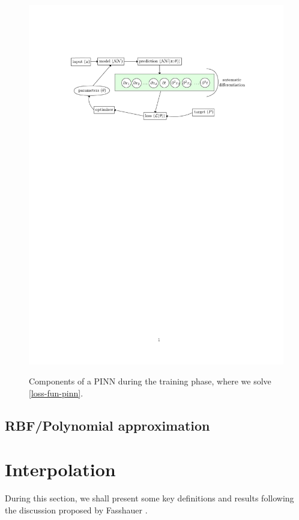 \documentclass[12pt]{report} %
\begin{document}
\begin{figure}[ht]
  \centering
  {\includegraphics[width=\textwidth, clip=true, trim={3cm 20cm 3cm 4cm}]{imagenes/autodiffgraph.pdf}}
  \caption{Components of a PINN during the training phase, where we solve \eqref{loss-fun-pinn}.
  }\label{fig:autodiffgraph}
\end{figure}

\section{RBF/Polynomial approximation}

\chapter{Interpolation}

During this section, we shall present some key definitions and results
following the discussion proposed by Fasshauer \cite{fasshauer2007meshfree}.
\end{document}
